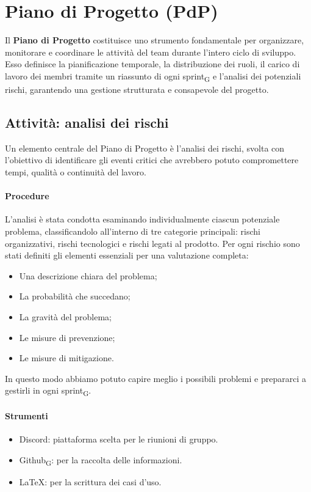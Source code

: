 \documentclass[11pt,a4paper]{article}
\newcommand{\gls}[1]{#1\textsubscript{G}}
\begin{document}
\newpage

\section{Piano di Progetto (PdP)}
Il \textbf{Piano di Progetto} costituisce uno strumento fondamentale per organizzare, monitorare e coordinare le attività del team durante l’intero ciclo di sviluppo. Esso definisce la pianificazione temporale, la distribuzione dei ruoli, il carico di lavoro dei membri tramite un riassunto di ogni \gls{sprint} e l’analisi dei potenziali rischi, garantendo una gestione strutturata e consapevole del progetto.

\subsection{Attività: analisi dei rischi}
Un elemento centrale del Piano di Progetto è l’analisi dei rischi, svolta con l’obiettivo di identificare gli eventi critici che avrebbero potuto compromettere tempi, qualità o continuità del lavoro.

\paragraph{Procedure}
L’analisi è stata condotta esaminando individualmente ciascun potenziale problema, classificandolo all’interno di tre categorie principali: rischi organizzativi, rischi tecnologici e rischi legati al prodotto.
Per ogni rischio sono stati definiti gli elementi essenziali per una valutazione completa:
\begin{itemize}
\item Una descrizione chiara del problema;
\item La probabilità che succedano;
\item La gravità del problema;
\item Le misure di prevenzione;
\item Le misure di mitigazione.
\end{itemize}
In questo modo abbiamo potuto capire meglio i possibili problemi e prepararci a gestirli in ogni \gls{sprint}.

\paragraph{Strumenti}
\begin{itemize}
\item Discord: piattaforma scelta per le riunioni di gruppo.
\item \gls{Github}: per la raccolta delle informazioni.
\item LaTeX: per la scrittura dei casi d'uso.
\end{itemize}
\end{document}
